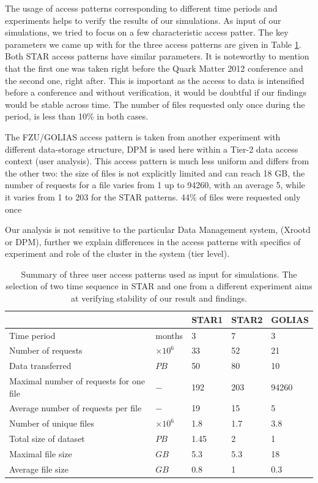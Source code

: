 \documentclass[english]{ddny}
\begin{document}
The usage of access patterns corresponding to different time periods and experiments helps to verify the results of our simulations. As input of our simulations, we tried to focus on a few characteristic access patter. The key parameters we came up with for the three access patterns are given in Table \ref{patterns}. Both STAR access patterns have similar parameters. It is noteworthy to mention that the first one was taken right before the Quark Matter 2012 conference and the second one, right after. This is important as the access to data is intensified before a conference and without verification, it would be doubtful if our findings would be stable across time. The  number  of files requested  only once during  the period, is less than  10\% in both cases. 

The FZU/GOLIAS access pattern is taken from another experiment with different data-storage structure, DPM is used here within a Tier-2 data access context (user analysis). This access pattern is much less uniform and differs from the other  two:  the size of files is not explicitly limited and can reach 18 GB, the number of requests for a file varies from 1 up to 94260, with an average 5, while it varies from 1 to 203 for the STAR patterns. 44\% of files were requested  only once

Our analysis is not sensitive to the particular Data Management system, (Xrootd or DPM), further we explain  differences in the access patterns with specifics of experiment and role of the cluster in the system (tier level).


\begin{centering}
\begin{table}
\caption{Summary of three user access patterns used as input for simulations. The selection of two time sequence in STAR and one from a different experiment aims at verifying stability of our result and findings.}
\centering
\begin{tabular}{lllll}
\hline
 &  &STAR1 & STAR2  & GOLIAS  \\ \hline
Time period& months & 3 & 7 & 3 \\ 
Number of requests&$ \times 10^{6} $& 33 & 52 & 21 \\ 
Data transferred& $ PB $ & 50 & 80 & 10 \\ 
Maximal number of requests for one file& $- $ &  192 & 203  & 94260 \\ 
Average number of requests per file& $- $ & 19 & 15 & 5 \\ 
Number of unique files& $\times 10^{6} $ & 1.8 & 1.7  & 3.8 \\ 
Total size of dataset& $PB $ & 1.45 & 2 & 1 \\
Maximal file size & $GB $ & 5.3 & 5.3 & 18 \\ 
Average file size & $ GB $& 0.8 & 1  & 0.3 \\ 	
\hline
\end{tabular}	
\label{patterns}
\end{table}
\end{centering}
\end{document}
